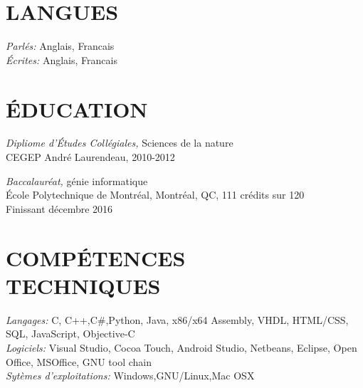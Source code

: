 \documentclass[margin, 10pt]{res} %
\begin{document}
\begin{resume}


\section{LANGUES}

{\sl Parl\'es:} Anglais, Francais \\
{\sl \'Ecrites:} Anglais, Francais


\section{\'EDUCATION}

{\sl Dipliome d'\'Etudes Coll\'egiales,} Sciences de la nature \\
CEGEP Andr\'e Laurendeau, 2010-2012 

{\sl Baccalaur\'eat,} g\'enie informatique \\
\'Ecole Polytechnique de Montr\'eal, Montr\'eal, QC, 111 cr\'edits sur 120\\
Finissant d\'ecembre 2016
 

\section{COMP\'ETENCES\\ TECHNIQUES} 

{\sl Langages:} 
C, C++,C\#,Python, Java, x86/x64 Assembly, VHDL, HTML/CSS, SQL, JavaScript, Objective-C \\
{\sl Logiciels:} 
Visual Studio, Cocoa Touch, Android Studio, Netbeans, Eclipse, Open Office, MSOffice, GNU tool chain \\
{\sl Syt\`emes d'exploitations:} Windows,GNU/Linux,Mac OSX

 

\end{resume}
\end{document}
